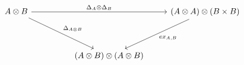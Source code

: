 \documentclass[11pt, oneside]{amsart}
\theoremstyle{definition}
\theoremstyle{definition}
\begin{document}
\begin{equation*}
\begin{tikzcd}
{A}\otimes{B} \arrow[rrr, "\Delta_{A}\otimes{\Delta_{B}}"] \arrow[rrdd, "\Delta_{A\otimes{B}}"] &  &                                       & (A\otimes{A})\otimes(B\times{B}) \arrow[ldd, "{ex_{A,B}}"] \\
                                                                                                &  &                                       &                                                            \\
                                                                                                &  & ({A}\otimes{B})\otimes({A}\otimes{B}) &                                                           
\end{tikzcd}
\end{equation*}
\end{document}
